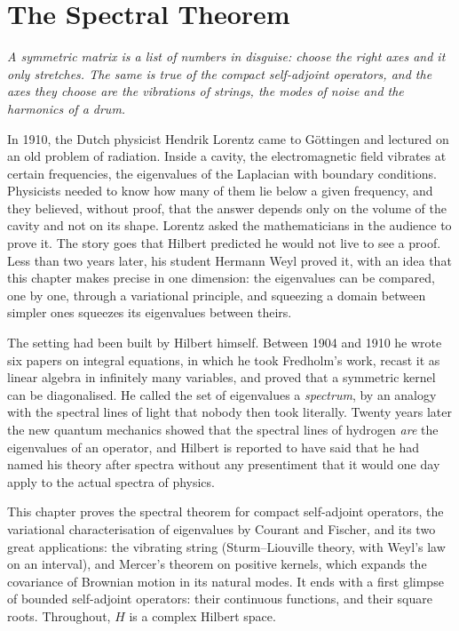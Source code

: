\chapter{The Spectral Theorem}

\begin{center}\itshape
A symmetric matrix is a list of numbers in disguise: choose the right axes and it only stretches. The same is true of the compact
self-adjoint operators, and the axes they choose are the vibrations of strings, the modes of noise and the harmonics of a drum.
\end{center}

In 1910, the Dutch physicist Hendrik Lorentz came to G\"ottingen and lectured on an old problem of radiation. Inside a cavity, the
electromagnetic field vibrates at certain frequencies, the eigenvalues of the Laplacian with boundary conditions. Physicists needed to
know how many of them lie below a given frequency, and they believed, without proof, that the answer depends only on the volume of the
cavity and not on its shape. Lorentz asked the mathematicians in the audience to prove it. The story goes that Hilbert predicted he
would not live to see a proof. Less than two years later, his student Hermann Weyl proved it, with an idea that this chapter makes
precise in one dimension: the eigenvalues can be compared, one by one, through a variational principle, and squeezing a domain between
simpler ones squeezes its eigenvalues between theirs.

The setting had been built by Hilbert himself. Between 1904 and 1910 he wrote six papers on integral equations, in which he took
Fredholm's work, recast it as linear algebra in infinitely many variables, and proved that a symmetric kernel can be diagonalised. He
called the set of eigenvalues a \emph{spectrum}, by an analogy with the spectral lines of light that nobody then took literally.
Twenty years later the new quantum mechanics showed that the spectral lines of hydrogen \emph{are} the eigenvalues of an operator, and
Hilbert is reported to have said that he had named his theory after spectra without any presentiment that it would one day apply to the
actual spectra of physics.

This chapter proves the spectral theorem for compact self-adjoint operators, the variational characterisation of eigenvalues by
Courant and Fischer, and its two great applications: the vibrating string (Sturm--Liouville theory, with Weyl's law on an interval),
and Mercer's theorem on positive kernels, which expands the covariance of Brownian motion in its natural modes. It ends with a first
glimpse of bounded self-adjoint operators: their continuous functions, and their square roots. Throughout, $H$ is a complex Hilbert
space.

